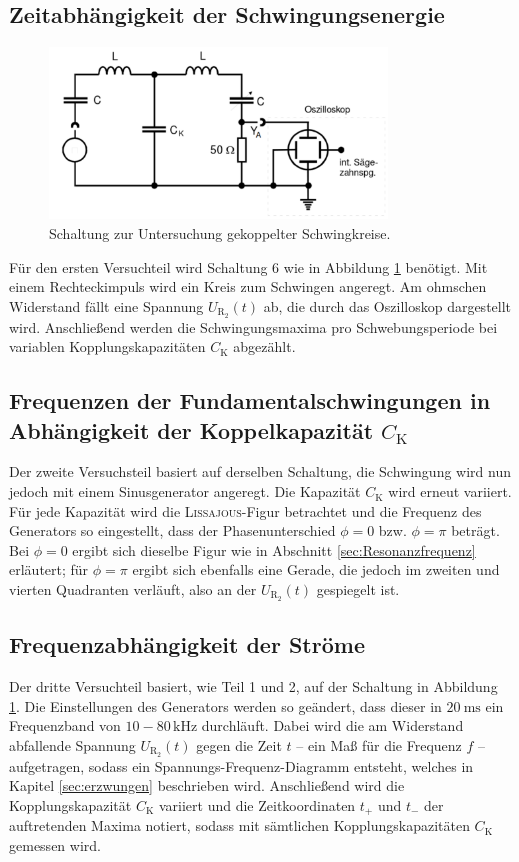 \subsection{Zeitabhängigkeit der Schwingungsenergie}
\begin{figure}[h]
	\centering
		\includegraphics[width=0.8\textwidth]{Bilder/Versuchsaufbau.pdf}		
\caption{Schaltung zur Untersuchung gekoppelter Schwingkreise. \cite{v355}}
	\label{fig:versuchsaufbau}
\end{figure}
Für den ersten Versuchteil wird Schaltung 6 wie in Abbildung \ref{fig:versuchsaufbau} benötigt. Mit einem Rechteckimpuls wird ein Kreis zum Schwingen angeregt. Am ohmschen Widerstand fällt eine Spannung $U_\mathup{R_2}(t)$ ab, die durch das Oszilloskop dargestellt wird. Anschließend werden die Schwingungsmaxima pro Schwebungsperiode bei variablen Kopplungskapazitäten $C_\mathup{K}$ abgezählt.

\subsection{Frequenzen der Fundamentalschwingungen in Abhängigkeit der Koppelkapazität $C_\text{K}$}
Der zweite Versuchsteil basiert auf derselben Schaltung, die Schwingung wird nun jedoch mit einem Sinusgenerator angeregt.
Die Kapazität $C_\mathup{K}$ wird erneut variiert. Für jede Kapazität wird die \textsc{Lissajous}-Figur betrachtet und die Frequenz des Generators so eingestellt, dass der Phasenunterschied $\phi=0$ bzw. $\phi=\pi$ beträgt. 
Bei $\phi=0$ ergibt sich dieselbe Figur wie in Abschnitt \ref{sec:Resonanzfrequenz} erläutert; 
für $\phi=\pi$  ergibt sich ebenfalls eine Gerade, die jedoch im zweiten und vierten Quadranten verläuft, also an der $U_\mathup{R_2}(t)$ gespiegelt ist.

\subsection{Frequenzabhängigkeit der Ströme}
\label{sec:Frequenzgenerator}
Der dritte Versuchteil basiert, wie Teil 1 und 2, auf der Schaltung in Abbildung \ref{fig:versuchsaufbau}. Die Einstellungen des Generators werden so geändert, dass dieser in $\SI{20}{\milli\second}$ ein Frequenzband von $10-80\,\si{\kilo\hertz}$ durchläuft.
Dabei wird die am Widerstand abfallende Spannung $U_\mathup{R_2}(t)$ gegen die Zeit $t$ -- ein Maß für die Frequenz $f$ -- aufgetragen, sodass ein Spannungs-Frequenz-Diagramm entsteht, welches in Kapitel \ref{sec:erzwungen} beschrieben wird.
Anschließend wird die Kopplungskapazität $C_\text{K}$ variiert und die Zeitkoordinaten $t_+$ und $t_-$ der auftretenden Maxima notiert, sodass mit sämtlichen Kopplungskapazitäten $C_\text{K}$ gemessen wird.

